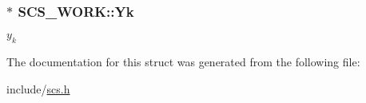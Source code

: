 \hypertarget{struct_s_c_s___w_o_r_k_a8fd4206b5c374331f6b0653209a0b1be}{
\subsubsection[{Yk}]{$\ast$ S\-C\-S\-\_\-\-W\-O\-R\-K\-::\-Yk}}\label{struct_s_c_s___w_o_r_k_a8fd4206b5c374331f6b0653209a0b1be}
$y_k$ 

The documentation for this struct was generated from the following file\-:\begin{DoxyCompactItemize}
\item 
include/\hyperlink{scs_8h}{scs.\-h}\end{DoxyCompactItemize}
